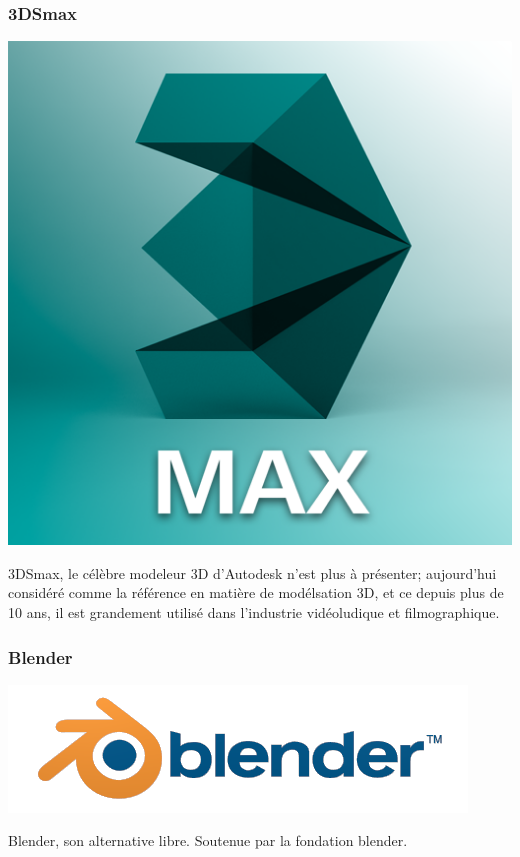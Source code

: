 	\subsubsection{3DSmax}
		\noindent\begin{minipage}{0.3\textwidth}
			\includegraphics[width=\linewidth]{1-PreEtude/img/3dsmax_logo}
			\end{minipage}
			\hfill
			\begin{minipage}{0.6\textwidth}\raggedleft
			3DSmax, le célèbre modeleur 3D d’Autodesk n’est plus à présenter; aujourd’hui considéré comme la référence en matière de modélsation 3D, et ce depuis plus de 10 ans, il est grandement utilisé dans l’industrie vidéoludique et filmographique.
		\end{minipage}
		
	
	\subsubsection{Blender}
		\noindent\begin{minipage}{0.3\textwidth}
			\includegraphics[width=\linewidth]{1-PreEtude/img/blender_logo}
			\end{minipage}
			\hfill
			\begin{minipage}{0.6\textwidth}\raggedleft
			Blender, son alternative libre. Soutenue par la fondation blender.%
		\end{minipage}
		
